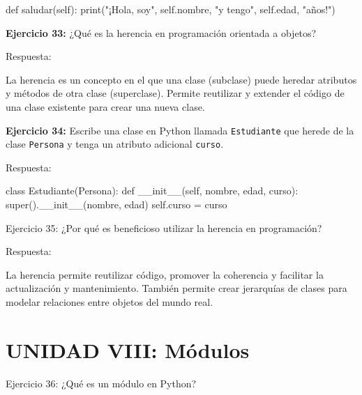 \documentclass[
  a4paper,
  DIV=11,
  numbers=noendperiod,
  onepage,
  openany]{scrreprt}
\newenvironment{Shaded}{\begin{snugshade}}{\end{snugshade}}
\newcommand{\BuiltInTok}[1]{\textcolor[rgb]{0.00,0.23,0.31}{#1}}
\newcommand{\FunctionTok}[1]{\textcolor[rgb]{0.28,0.35,0.67}{#1}}
\newcommand{\KeywordTok}[1]{\textcolor[rgb]{0.00,0.23,0.31}{#1}}
\newcommand{\NormalTok}[1]{\textcolor[rgb]{0.00,0.23,0.31}{#1}}
\newcommand{\OperatorTok}[1]{\textcolor[rgb]{0.37,0.37,0.37}{#1}}
\newcommand{\StringTok}[1]{\textcolor[rgb]{0.13,0.47,0.30}{#1}}
\newcommand{\VariableTok}[1]{\textcolor[rgb]{0.07,0.07,0.07}{#1}}
\begin{document}
\begin{Shaded}
\begin{Highlighting}[]
\KeywordTok{def}\NormalTok{ saludar(}\VariableTok{self}\NormalTok{):}
    \BuiltInTok{print}\NormalTok{(}\StringTok{"¡Hola, soy"}\NormalTok{, }\VariableTok{self}\NormalTok{.nombre, }\StringTok{"y tengo"}\NormalTok{, }\VariableTok{self}\NormalTok{.edad, }\StringTok{"años!"}\NormalTok{)}
\end{Highlighting}
\end{Shaded}

\textbf{Ejercicio 33:} ¿Qué es la herencia en programación orientada a
objetos?

Respuesta:

La herencia es un concepto en el que una clase (subclase) puede heredar
atributos y métodos de otra clase (superclase). Permite reutilizar y
extender el código de una clase existente para crear una nueva clase.

\textbf{Ejercicio 34:} Escribe una clase en Python llamada
\texttt{Estudiante} que herede de la clase \texttt{Persona} y tenga un
atributo adicional \texttt{curso}.

Respuesta:

\begin{Shaded}
\begin{Highlighting}[]
\KeywordTok{class}\NormalTok{ Estudiante(Persona):}
    \KeywordTok{def} \FunctionTok{\_\_init\_\_}\NormalTok{(}\VariableTok{self}\NormalTok{, nombre, edad, curso):}
        \BuiltInTok{super}\NormalTok{().}\FunctionTok{\_\_init\_\_}\NormalTok{(nombre, edad)}
        \VariableTok{self}\NormalTok{.curso }\OperatorTok{=}\NormalTok{ curso}
\end{Highlighting}
\end{Shaded}

Ejercicio 35: ¿Por qué es beneficioso utilizar la herencia en
programación?

Respuesta:

La herencia permite reutilizar código, promover la coherencia y
facilitar la actualización y mantenimiento. También permite crear
jerarquías de clases para modelar relaciones entre objetos del mundo
real.

\section{UNIDAD VIII: Módulos}\label{unidad-viii-muxf3dulos}

Ejercicio 36: ¿Qué es un módulo en Python?
\end{document}
